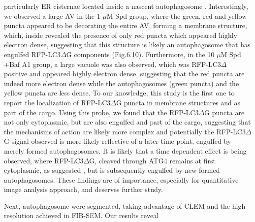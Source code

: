 particularly ER cisternae located inside a nascent autophagosome \citep{Yla-Anttila2009}. Interestingly, we observed a large AV in the 1 $\mu$M Spd group, where the green, red and yellow puncta appeared to be decorating the entire AV, forming a membrane structure, which, inside revealed the presence of only red puncta which appeared highly electron dense, suggesting that this structure is likely an autophagosome that has engulfed RFP-LC3$\Delta$G components (Fig.6.10). Furthermore, in the 10 $\mu$M Spd +Baf A1 group, a large vacuole was also observed, which was RFP-LC3$\Delta$ positive and appeared highly electron dense, suggesting that the red puncta are indeed more electron dense while the autophagosomes (green puncta) and the yellow puncta are less dense. To our knowledge, this study is the first one to report the localization of RFP-LC3$\Delta$G puncta in membrane structures and as part of the cargo. Using this probe, we found that the RFP-LC3$\Delta$G puncta are not only cytoplasmic, but are also engulfed and part of the cargo, suggesting that the mechanisms of action are likely more complex and potentially the RFP-LC3$\Delta$G signal observed is more likely reflective of a later time point, engulfed by merely formed autophagosomes. It is likely that a time dependent effect is being observed, where RFP-LC3$\Delta$G, cleaved  through ATG4 remains at first cytoplasmic, as suggested \citep{Kaizuka2016}, but is subsequently engulfed by new formed autophagosomes. These findings are of importance, especially for quantitative image analysis approach, and deserves further study.

Next, autophagosome were segmented, taking advantage of CLEM and the high resolution achieved in FIB-SEM. Our results reveal





























